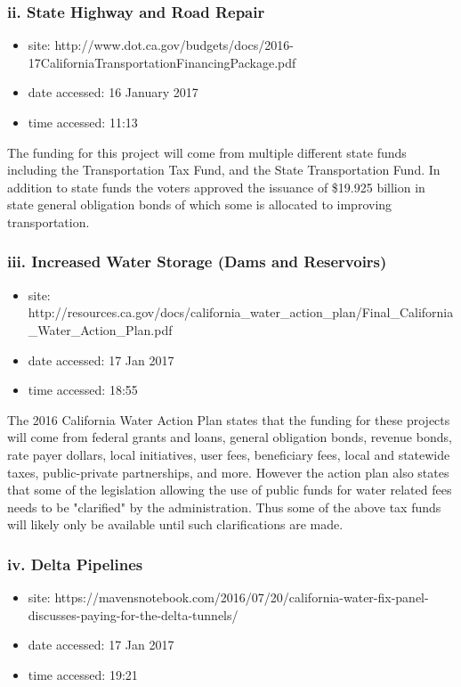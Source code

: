 \documentclass[12pt]{article} %
\begin{document}
		\subsubsection{ii. State Highway and Road Repair}
			\begin{itemize}
				\item site: {\small http://www.dot.ca.gov/budgets/docs/2016-17CaliforniaTransportationFinancingPackage.pdf}
				\item date accessed: 16 January 2017
				\item time accessed: 11:13
			\end{itemize}
	
			The funding for this project will come from multiple different state funds including the Transportation Tax Fund, and the State Transportation Fund. In addition to state funds the voters approved the issuance of \$19.925 billion in state general obligation bonds of which some is allocated to improving transportation.
		
		\subsubsection{iii. Increased Water Storage (Dams and Reservoirs)}
			\begin{itemize}
				\item site: {\small http://resources.ca.gov/docs/california\_water\_action\_plan/Final\_California\_Water\_Action\_Plan.pdf}
				\item date accessed: 17 Jan 2017
				\item time accessed: 18:55
			\end{itemize}
			
			The 2016 California Water Action Plan states that the funding for these projects will come from federal grants and loans, general obligation bonds, revenue bonds, rate payer dollars, local initiatives, user fees, beneficiary fees, local and statewide taxes, public-private partnerships, and more. However the action plan also states that some of the legislation allowing the use of public funds for water related fees needs to be "clarified" by the administration. Thus some of the above tax funds will likely only be available until such clarifications are made.
			
		\subsubsection{iv. Delta Pipelines}
			\begin{itemize}
				\item site: {\small https://mavensnotebook.com/2016/07/20/california-water-fix-panel-discusses-paying-for-the-delta-tunnels/}
				\item date accessed: 17 Jan 2017
				\item time accessed: 19:21
			\end{itemize}
\end{document}
